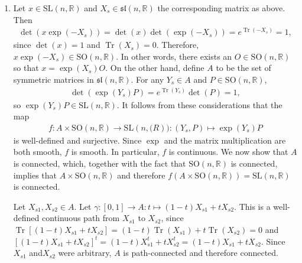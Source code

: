 \documentclass{article}
\DeclareMathOperator{\Tr}{Tr}
\newcommand{\bb}{\mathbb}
\theoremstyle{remark}
\newcommand{\SL}{\mathrm{SL}}
\begin{document}
\begin{enumerate}[label=(\roman*)]
    \item Let $x \in \SL(n,\bb{R})$ and $X_s \in \mathfrak{sl}(n,\bb{R})$ the corresponding matrix as above. Then
    \begin{align*}
        \det\left(x \exp(-X_s)\right) = \det(x) \det\left(\exp(-X_s)\right) = e^{\Tr(-X_s)} = 1,
    \end{align*}
    since $\det(x)=1$ and $\Tr(X_s) = 0$. Therefore, $x \exp(-X_s) \in \mathrm{SO}(n,\bb{R})$. In other words, there exists an $O \in \mathrm{SO}(n,\bb{R})$ so that $x = \exp(X_s)O$. On the other hand, define $A$ to be the set of symmetric matrices in $\mathfrak{sl}(n,\bb{R})$. For any $Y_s \in A$ and $P \in \mathrm{SO}(n,\bb{R})$,
    \begin{align*}
        \det\left(\exp(Y_s) P\right) = e^{\Tr(Y_s)} \det(P) = 1,
    \end{align*}
    so $\exp(Y_s) P \in \SL(n,\bb{R})$. It follows from these considerations that the map
    \begin{align*}
        f : A \times \mathrm{SO}(n,\bb{R}) \to \SL(n,\bb(R)) : (Y_s, P) \mapsto \exp(Y_s)P
    \end{align*}
    is well-defined and surjective. Since $\exp$ and the matrix multiplication are both smooth, $f$ is smooth. In particular, $f$ is continuous. We now show that $A$ is connected, which, together with the fact that $\mathrm{SO}(n,\bb{R})$ is connected, implies that $A \times \mathrm{SO}(n,\bb{R})$ and therefore $f(A \times \mathrm{SO}(n,\bb{R})) = \SL(n,\bb{R})$ is connected.
    
    Let $X_{s1}, X_{s2} \in A$. Let $\gamma : [0,1] \to A : t \mapsto (1-t)X_{s1} + tX_{s2}$. This is a well-defined continuous path from $X_{s1}$ to $X_{s2}$, since $\Tr\left[(1-t)X_{s1} + tX_{s2}\right] = (1-t)\Tr(X_{s1}) + t\Tr(X_{s2}) = 0$ and $\left[(1-t)X_{s1} + tX_{s2}\right]^t = (1-t)X_{s1}^t + tX_{s2}^t = (1-t)X_{s1} + tX_{s2}$. Since $X_{s1}$ and$X_{s2}$ were arbitrary, $A$ is path-connected and therefore connected.

\end{enumerate}
\end{document}
